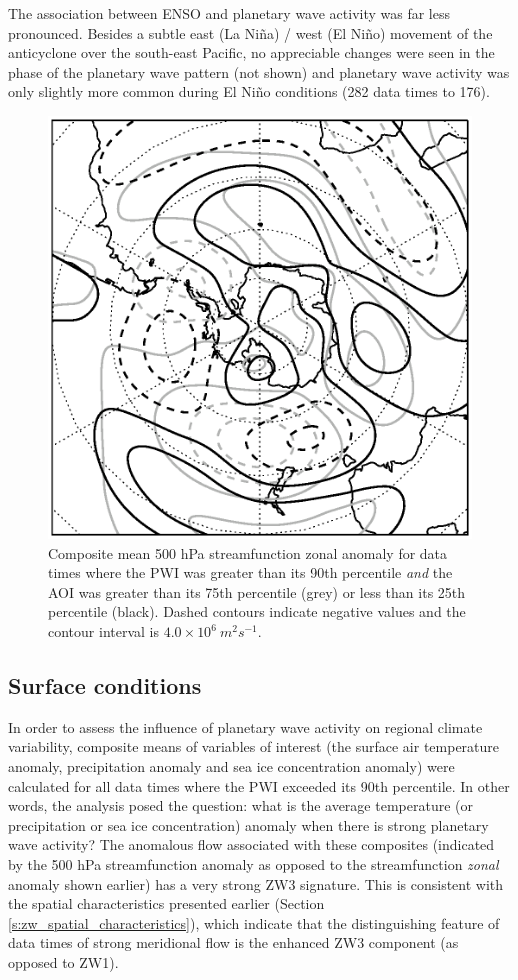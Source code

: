 The association between ENSO and planetary wave activity was far less pronounced. Besides a subtle east (La Ni\~{n}a) / west (El Ni\~{n}o) movement of the anticyclone over the south-east Pacific, no appreciable changes were seen in the phase of the planetary wave pattern (not shown) and planetary wave activity was only slightly more common during El Ni\~{n}o conditions (282 data times to 176).      

\begin{figure}
\begin{center}
\includegraphics[width=0.56\columnwidth]{figures/zonalwaves/sf-composite_samgt75pct-samlt25pct-pwigt90pct_ERAInterim_500hPa_030day-runmean_native-zonal-anom-shextropics15.eps}
\caption[Comparison of the composite mean 500 hPa streamfunction zonal anomaly for data times where the PWI was greater than its 90th percentile and the SAM was (a) positive and (b) negative]{\label{fig:sam_composite}
Composite mean 500 hPa streamfunction zonal anomaly for data times where the PWI was greater than its 90th percentile \textit{and} the AOI was greater than its 75th percentile (grey) or less than its 25th percentile (black). Dashed contours indicate negative values and the contour interval is $4.0 \times 10^6 \: m^2 s^{-1}$.}
\end{center}
\end{figure}


\subsection{Surface conditions}\label{s:surface_conditions}

In order to assess the influence of planetary wave activity on regional climate variability, composite means of variables of interest (the surface air temperature anomaly, precipitation anomaly and sea ice concentration anomaly) were calculated for all data times where the PWI exceeded its 90th percentile. In other words, the analysis posed the question: what is the average temperature (or precipitation or sea ice concentration) anomaly when there is strong planetary wave activity? The anomalous flow associated with these composites (indicated by the 500 hPa streamfunction anomaly as opposed to the streamfunction \textit{zonal} anomaly shown earlier) has a very strong ZW3 signature. This is consistent with the spatial characteristics presented earlier (Section \ref{s:zw_spatial_characteristics}), which indicate that the distinguishing feature of data times of strong meridional flow is the enhanced ZW3 component (as opposed to ZW1).  


